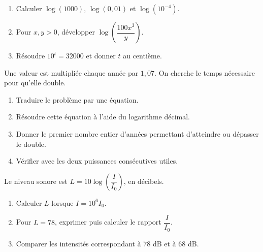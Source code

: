 \begin{exercice}
\begin{enumerate}
\item Calculer $\log(1000)$, $\log(0{,}01)$ et $\log(10^{-4})$.
\item Pour $x,y>0$, développer $\log\!\left(\dfrac{100x^3}{y} \right)$.
\item Résoudre $10^t=32000$ et donner $t$ au centième.
\end{enumerate}
\end{exercice}
\begin{exercice}
Une valeur est multipliée chaque année par $1{,}07$. On cherche le temps nécessaire pour qu'elle double.
\begin{enumerate}
\item Traduire le problème par une équation.
\item Résoudre cette équation à l'aide du logarithme décimal.
\item Donner le premier nombre entier d'années permettant d'atteindre ou dépasser le double.
\item Vérifier avec les deux puissances consécutives utiles.
\end{enumerate}
\end{exercice}
\begin{exercice}
Le niveau sonore est $L=10\log\!\left(\dfrac I{I_0}\right)$, en décibels.
\begin{enumerate}
\item Calculer $L$ lorsque $I=10^6I_0$.
\item Pour $L=78$, exprimer puis calculer le rapport $\dfrac I{I_0}$.
\item Comparer les intensités correspondant à $78$ dB et à $68$ dB.
\end{enumerate}
\end{exercice}

